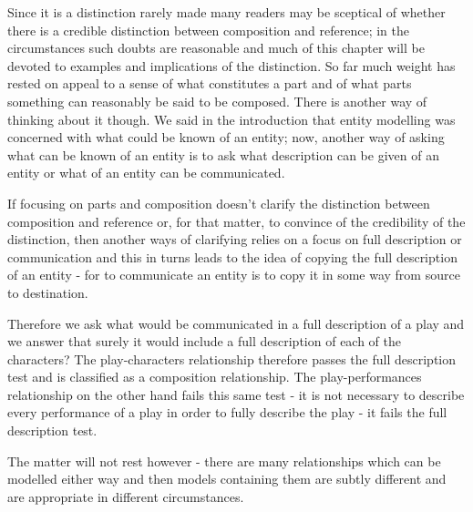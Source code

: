 Since it is a distinction rarely made many readers may be sceptical of whether there is a credible distinction between composition and reference; in the circumstances such doubts are reasonable and much of this chapter will be devoted to examples and implications of the distinction. So far much weight has rested on appeal to a sense of what constitutes a part and of what parts something can reasonably be said to be composed. There is another way of thinking about it though. We said in the introduction that entity modelling was concerned with what could be known of an entity; now, another way of asking what can be known of an entity is to ask what description can be given of an entity or what of an entity can be communicated.

If focusing on parts and composition doesn't clarify the distinction between composition and reference or, for that matter, to convince of the credibility of the distinction, then another ways of clarifying relies on a focus on full description or communication and this in turns leads to the idea of copying the full description of an entity - for to communicate an entity is to copy it in some way from source to destination.

Therefore we ask what would be communicated in a full description of a play and we answer that surely it would include a full description of each of the characters? The play-characters relationship therefore passes the full description test and is classified as a composition relationship. The play-performances relationship on the other hand fails this same test - it is not necessary to describe every performance of a play in order to fully describe the play - it fails the full description test.

The matter will not rest however - there are many relationships which can be modelled either way and then models containing them are subtly different and are appropriate in different circumstances.


